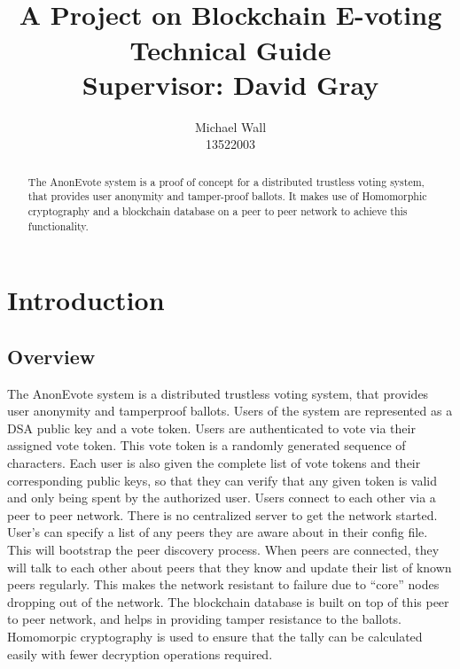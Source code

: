 \documentclass[a4paper,12pt]{article}
\title{\proj{}\\A Project on Blockchain E-voting\\Technical Guide\\Supervisor: David Gray}
\author{Michael Wall\\13522003}
\newcommand{\proj}{AnonEvote}
\begin{document}
\maketitle
\begin{abstract}
    The \proj{} system is a proof of concept for a distributed trustless voting system, that provides user anonymity and tamper-proof ballots. It makes use of Homomorphic cryptography and a blockchain database on a peer to peer network to achieve this functionality.
\end{abstract}

\newpage

\tableofcontents

\newpage

\section{Introduction}
\subsection{Overview}
The \proj{} system is a distributed trustless voting system, that provides user anonymity and tamperproof ballots. Users of the system are represented as a DSA public key and a vote token. Users are authenticated to vote via their assigned vote token. This vote token is a randomly generated sequence of characters. Each user is also given the complete list of vote tokens and their corresponding public keys, so that they can verify that any given token is valid and only being spent by the authorized user. Users connect to each other via a peer to peer network. There is no centralized server to get the network started. User's can specify a list of any peers they are aware about in their config file. This will bootstrap the peer discovery process. When peers are connected, they will talk to each other about peers that they know and update their list of known peers regularly. This makes the network resistant to failure due to ``core'' nodes dropping out of the network. The blockchain database is built on top of this peer to peer network, and helps in providing tamper resistance to the ballots. Homomorpic cryptography is used to ensure that the tally can be calculated easily with fewer decryption operations required.
\end{document}
